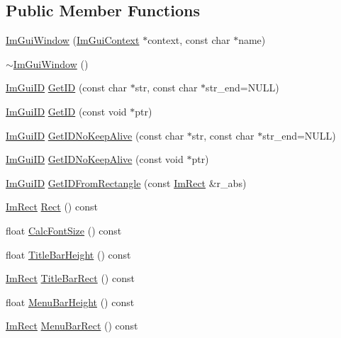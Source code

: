 \subsection*{Public Member Functions}
\begin{DoxyCompactItemize}
\item 
\mbox{\hyperlink{struct_im_gui_window_acd2909ae3b7079de81d528327cc11dfd}{Im\+Gui\+Window}} (\mbox{\hyperlink{struct_im_gui_context}{Im\+Gui\+Context}} $\ast$context, const char $\ast$name)
\item 
\mbox{\hyperlink{struct_im_gui_window_a8e81d730c3a39a71e6b6ca4654451c53}{$\sim$\+Im\+Gui\+Window}} ()
\item 
\mbox{\hyperlink{imgui_8h_a1785c9b6f4e16406764a85f32582236f}{Im\+Gui\+ID}} \mbox{\hyperlink{struct_im_gui_window_a66400a63bc0b54d7d29e08d1b1b1a42b}{Get\+ID}} (const char $\ast$str, const char $\ast$str\+\_\+end=N\+U\+LL)
\item 
\mbox{\hyperlink{imgui_8h_a1785c9b6f4e16406764a85f32582236f}{Im\+Gui\+ID}} \mbox{\hyperlink{struct_im_gui_window_aae21dffb343cabca9414499b827912a8}{Get\+ID}} (const void $\ast$ptr)
\item 
\mbox{\hyperlink{imgui_8h_a1785c9b6f4e16406764a85f32582236f}{Im\+Gui\+ID}} \mbox{\hyperlink{struct_im_gui_window_adc0a43f74a0b53a15a4bc4fea05524fe}{Get\+I\+D\+No\+Keep\+Alive}} (const char $\ast$str, const char $\ast$str\+\_\+end=N\+U\+LL)
\item 
\mbox{\hyperlink{imgui_8h_a1785c9b6f4e16406764a85f32582236f}{Im\+Gui\+ID}} \mbox{\hyperlink{struct_im_gui_window_aea0ace882f6e8ec9d6825d808c975203}{Get\+I\+D\+No\+Keep\+Alive}} (const void $\ast$ptr)
\item 
\mbox{\hyperlink{imgui_8h_a1785c9b6f4e16406764a85f32582236f}{Im\+Gui\+ID}} \mbox{\hyperlink{struct_im_gui_window_a44931b6e73248930490d2c89377a8233}{Get\+I\+D\+From\+Rectangle}} (const \mbox{\hyperlink{struct_im_rect}{Im\+Rect}} \&r\+\_\+abs)
\item 
\mbox{\hyperlink{struct_im_rect}{Im\+Rect}} \mbox{\hyperlink{struct_im_gui_window_a147da28bf5d167cbe0a363c4a578dea1}{Rect}} () const
\item 
float \mbox{\hyperlink{struct_im_gui_window_a6881ed65e208fb6e015d3ae6bccfc794}{Calc\+Font\+Size}} () const
\item 
float \mbox{\hyperlink{struct_im_gui_window_ad1580cc8b5bdf981c6ed2eb22ecd7dbb}{Title\+Bar\+Height}} () const
\item 
\mbox{\hyperlink{struct_im_rect}{Im\+Rect}} \mbox{\hyperlink{struct_im_gui_window_a06884e1bc80e460e51e1626b5b976196}{Title\+Bar\+Rect}} () const
\item 
float \mbox{\hyperlink{struct_im_gui_window_acfb8bdad2e3ea6102589813ae32d0364}{Menu\+Bar\+Height}} () const
\item 
\mbox{\hyperlink{struct_im_rect}{Im\+Rect}} \mbox{\hyperlink{struct_im_gui_window_a59df76c1445aaaf0b43456c83c1a88e5}{Menu\+Bar\+Rect}} () const
\end{DoxyCompactItemize}
